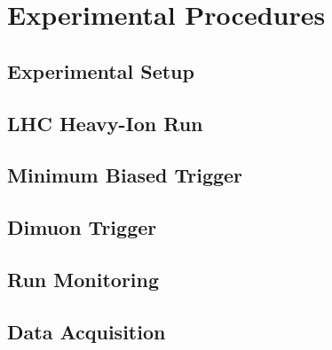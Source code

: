 \chapter{Experimental Procedures}

\section{Experimental Setup}

\section{LHC Heavy-Ion Run}

\section{Minimum Biased Trigger}

\section{Dimuon Trigger}

\section{Run Monitoring}

\section{Data Acquisition}

